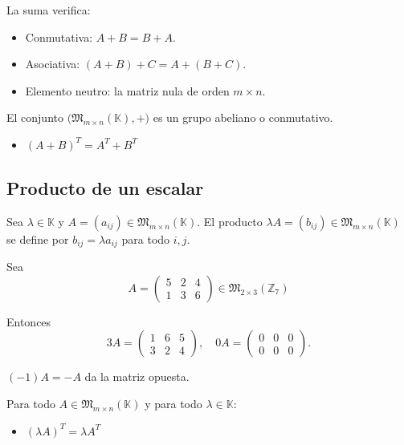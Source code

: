 \documentclass[a4paper,12pt]{article}
\begin{document}
\begin{procedimiento}[title=Propiedades de la suma]
La suma verifica:
\begin{itemize}
\item Conmutativa: $A + B = B + A$.
\item Asociativa: $(A + B) + C = A + (B + C)$.
\item Elemento neutro: la matriz nula de orden $m \times n$.
\end{itemize}
El conjunto $\big(\mathfrak{M}_{m \times n}(\mathbb{K}), +\big)$ es un grupo abeliano o conmutativo.
\begin{itemize}
    \item $(A+B)^T = A^T + B^T$
\end{itemize}
\end{procedimiento}


\subsection{Producto de un escalar}

\begin{procedimiento}[title=Producto de un escalar]
Sea $\lambda \in \mathbb{K}$ y $A = (a_{ij}) \in \mathfrak{M}_{m \times n}(\mathbb{K})$.  
El producto $\lambda A = (b_{ij}) \in \mathfrak{M}_{m \times n}(\mathbb{K})$ se define por $b_{ij} = \lambda a_{ij}$ para todo $i,j$.
\end{procedimiento}

\begin{ejemplo}[title=Ejemplo de producto por un escalar]
Sea
\[
A=
\begin{pmatrix}
5 & 2 & 4 \\
1 & 3 & 6
\end{pmatrix} \in \mathfrak{M}_{2\times3}(\mathbb{Z}_7)
\]

Entonces
\[
3A =
\begin{pmatrix}
1 & 6 & 5 \\
3 & 2 & 4
\end{pmatrix}, 
\quad
0A =
\begin{pmatrix}
0 & 0 & 0 \\
0 & 0 & 0
\end{pmatrix}.
\]
\end{ejemplo}

\begin{procedimiento}[title=Matriz opuesta]
$(-1)A = -A$ da la matriz opuesta.
\end{procedimiento}

\begin{procedimiento}[title=Propiedades del producto de un escalar]
Para todo $A \in \mathfrak{M}_{m \times n}(\mathbb{K})$ y para todo $\lambda \in \mathbb{K}$:
\begin{itemize}
\item $(\lambda A)^T = \lambda A^T$
\end{itemize}
\end{procedimiento}
\end{document}
